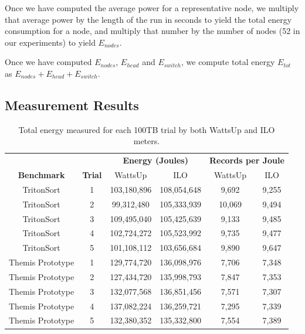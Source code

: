 Once we have computed the average power for a representative node, we multiply
that average power by the length of the run in seconds to yield the total energy
consumption for a node, and multiply that number by the number of nodes (52 in
our experiments) to yield $E_{nodes}$.

Once we have computed $E_{nodes}$, $E_{head}$ and $E_{switch}$, we compute
total energy $E_{tot}$ as $E_{nodes} + E_{head} + E_{switch}$.

\subsection{Measurement Results}

\begin{table}
\centering
\caption{\label{table:raw_energy} Total energy measured for each 100TB trial by
  both WattsUp and ILO meters.}
\begin{tabular}[t]{|c|c|cc|cc|}
\hline
 &  & \multicolumn{2}{c|}{\textbf{Energy (Joules)}} & \multicolumn{2}{c|}{\textbf{Records
per Joule}}\\
\textbf{Benchmark} & \textbf{Trial} & WattsUp & ILO & WattsUp & ILO\\
\hline
TritonSort & 1 & 103,180,896 & 108,054,648 & 9,692 & 9,255 \\
TritonSort & 2 & 99,312,480 & 105,333,939 & 10,069 & 9,494 \\
TritonSort & 3 & 109,495,040 & 105,425,639 & 9,133 & 9,485 \\
TritonSort & 4 & 102,724,272 & 105,523,992 & 9,735 & 9,477 \\
TritonSort & 5 & 101,108,112 & 103,656,684 & 9,890 & 9,647 \\
\hline
\hline
Themis Prototype & 1 & 129,774,720 & 136,098,976 & 7,706 & 7,348 \\
Themis Prototype & 2 & 127,434,720 & 135,998,793 & 7,847 & 7,353 \\
Themis Prototype & 3 & 132,077,568 & 136,851,456 & 7,571 & 7,307 \\
Themis Prototype & 4 & 137,082,224 & 136,259,721 & 7,295 & 7,339 \\
Themis Prototype & 5 & 132,380,352 & 135,332,800 & 7,554 & 7,389 \\
\hline
\end{tabular}
\end{table}


